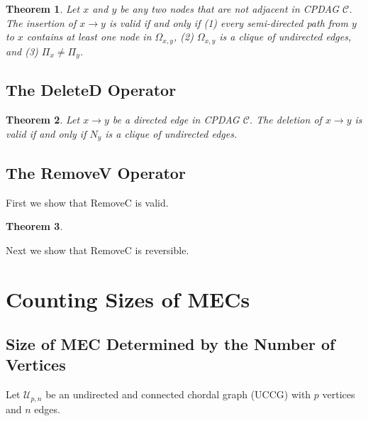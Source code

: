 \documentclass{article}
\newtheorem{theorem}{Theorem}[section]
\theoremstyle{definition}
\newcommand{\cC}{\mathcal{C}}
\newcommand{\cU}{\mathcal{U}}
\newcommand{\<}{\left\langle}
\renewcommand{\>}{\right\rangle}
\begin{document}
\begin{theorem}
    Let $x$ and $y$ be any two nodes that are not adjacent in CPDAG $\cC$. The insertion of $x \rightarrow y$ is valid if and only if (1) every semi-directed path from $y$ to $x$ contains at least one node in $\Omega_{x,y}$, (2) $\Omega_{x,y}$ is a clique of undirected edges, and (3) $\Pi_x \ne \Pi_y$.
\end{theorem}

\subsection{The DeleteD Operator}
\begin{theorem}
    Let $x \rightarrow y$ be a directed edge in CPDAG $\cC$. The deletion of $x \rightarrow y$ is valid if and only if $N_y$ is a clique of undirected edges.
\end{theorem}


\subsection{The RemoveV Operator}
First we show that RemoveC is valid.
\begin{theorem}
    
\end{theorem}

Next we show that RemoveC is reversible.

\section{Counting Sizes of MECs}
\subsection{Size of MEC Determined by the Number of Vertices}
Let $\cU_{p,n}$ be an undirected and connected chordal graph (UCCG) with $p$ vertices and $n$ edges.
\end{document}
